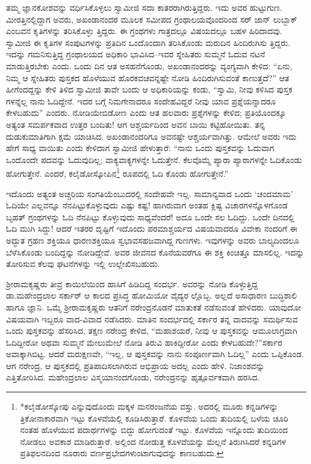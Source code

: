 ತಮ್ಮ ಜ್ಞಾನಕೋಶವನ್ನು ವರ್ಧಿಸಿಕೊಳ್ಳಲು ಸ್ವಾಮೀಜಿ ಸದಾ ಕಾತರರಾಗಿರುತ್ತಿದ್ದರು. ಇದು ಅವರ ಹುಟ್ಟುಗುಣ. ಮೀರತ್ತಿನಲ್ಲಿದ್ದಾಗ ಅವರು, ಅಖಂಡಾನಂದರ ಮೂಲಕ ಸಮೀಪದ ಗ್ರಂಥಾಲಯವೊಂದರಿಂದ ಸರ್ ಜಾನ್ ಲುಬ್ಬಾಕ್ ಎಂಬವನ ಕೃತಿಗಳನ್ನು ತರಿಸಿಕೊಳ್ಳು ತ್ತಿದ್ದರು. ಈ ಗ್ರಂಥಗಳು ಗಾತ್ರದಲ್ಲೂ ವಿಷಯದಲ್ಲೂ ಬಹಳ ಹಿರಿದಾದವು. ಸ್ವಾಮೀಜಿ ಈ ಕೃತಿಗಳ ಸಂಪುಟಗಳನ್ನು ಪ್ರತಿದಿನ ಒಂದೊಂದಾಗಿ ತರಿಸಿಕೊಂಡು ಮರುದಿನ ಹಿಂದಿರುಗಿಸು ತ್ತಿದ್ದರು. ಇದನ್ನು ಗಮನಿಸುತ್ತಿದ್ದ ಗ್ರಂಥಾಲಯದ ಅಧಿಕಾರಿ ಭಾವಿಸಿದ–ಇವರ ಸ್ನೇಹಿತರು ಸುಮ್ಮನೆ ಓದುವ ನಟನೆ ಮಾಡುತ್ತಿರಬೇಕು ಎಂದು. ಒಂದು ದಿನ ಆತ ಅಸಹನೆಗೊಂಡು, ಅಖಂಡಾನಂದರನ್ನು ವ್ಯಂಗ್ಯವಾಗಿ ಕೇಳಿದ: “ಏನು, ನಿಮ್ಮ ಆ ಸ್ನೇಹಿತರು ಪುಸ್ತಕದ ಹೊಳೆಯುವ ಹೊರಕವಚವನ್ನಷ್ಟೇ ನೋಡಿ ಹಿಂದಿರುಗಿಸುವಂತೆ ಕಾಣುತ್ತದೆ?” ಆತ ಹೀಗೆಂದದ್ದನ್ನು ಕೇಳಿ ತಿಳಿದ ಸ್ವಾಮೀಜಿ ತಾವೇ ಬಂದು ಆ ಅಧಿಕಾರಿಯನ್ನು ಕಂಡು, “ಸ್ವಾಮಿ, ನೀವು ಕಳಿಸಿದ ಪುಸ್ತಕ ಗಳನ್ನೆಲ್ಲ ನಾನು ಓದಿದ್ದೇನೆ. ಇದರ ಬಗ್ಗೆ ನಿಮಗೇನಾದರೂ ಸಂದೇಹವಿದ್ದರೆ ನೀವು ಯಾವ ಪ್ರಶ್ನೆಯನ್ನಾದರೂ ಕೇಳಬಹುದು” ಎಂದರು. ನೋಡಿಯೇಬಿಡೋಣ ಎಂದು ಆತ ಹಲವಾರು ಪ್ರಶ್ನೆಗಳನ್ನು ಕೇಳಿದ; ಪ್ರತಿಯೊಂದಕ್ಕೂ ಅತ್ಯಂತ ಸಮರ್ಪಕವಾದ ಉತ್ತರ ಬಂದಿತು! ಆಗ ಆಶ್ಚರ್ಯದಿಂದ ಅವನ ಬಾಯಿ ಕಟ್ಟಿಹೋಯಿತು. ತನ್ನ ದುಡುಕುಮಾತಿಗಾಗಿ ಕ್ಷಮೆ ಯಾಚಿಸಿದ. ಅಖಂಡಾನಂದರಿಗೂ ಅವನಷ್ಟೇ ಆಶ್ಚರ್ಯವಾಗಿತ್ತು. ಆಮೇಲೆ ಅವರು ಇದು ಹೇಗೆ ಸಾಧ್ಯ ವಾಯಿತು ಎಂದು ಕೇಳಿದಾಗ ಸ್ವಾಮೀಜಿ ಹೇಳುತ್ತಾರೆ: “ನಾನು ಒಂದು ಪುಸ್ತಕವನ್ನು ಓದುವಾಗ ಒಂದೊಂದೇ ಪದವನ್ನು ಓದುವುದಿಲ್ಲ; ವಾಕ್ಯವಾಕ್ಯಗಳನ್ನೇ ಓದುತ್ತೇನೆ. ಕೆಲವೊಮ್ಮೆ ಪ್ಯಾರಾ ಪ್ಯಾರಾಗಳನ್ನೇ ಓದಿಕೊಂಡು ಹೋಗುತ್ತೇನೆ. ಎಂದರೆ, ಕಲೈಡೋಸ್ಕೋಪಿನ\footnote{*ಕಲೈಡೋಸ್ಕೋಪು ಎನ್ನುವುದೊಂದು ಮಕ್ಕಳ ಮನರಂಜನೆಯ ವಸ್ತು. ಅದರಲ್ಲಿ ಮೂರು ಕನ್ನಡಿಗಳನ್ನು ತ್ರಿಕೋನಾಕಾರವಾಗಿ ಇಟ್ಟು ಕೊಳವೆಯಲ್ಲಿ ಕೂಡಿಸಿರುತ್ತಾರೆ. ಕೊಳವೆಯ ಒಂದು ತುದಿಯಲ್ಲಿ ಬಳೆಯ ಚೂರಿ ನಂತಹ ಹೊಳೆಯುವ ಪದಾರ್ಥಗಳನ್ನು ಬಿದ್ದು ಹೋಗುದಂತೆ ಇಟ್ಟು. ಕೊಳವೆಯ ಇನ್ನೊಂದು ತುದಿಯಿಂದ ನೋಡಲು ಅವಕಾಶ ಮಾಡಿರುತ್ತಾರೆ. ಅಲ್ಲಿಂದ ನೋಡುತ್ತ ಕೊಳವೆಯನ್ನು ಮೆಲ್ಲನೆ ತಿರುಗಿಸಿದರೆ ಕನ್ನಡಿಗಳ ಪ್ರತಿಫಲನದಿಂದ ನೂರಾರು ವರ್ಣಪ್ರಭೇದಗಳುಂಟಾಗುವುದನ್ನು ಕಾಣಬಹುದು.} ರೂಪದಲ್ಲಿ ಓದಿ ಕೊಂಡು ಹೋಗುತ್ತೇನೆ.”

ಇದೊಂದು ಅತ್ಯಂತ ಅಚ್ಚರಿಯ ಸಂಗತಿಯೆಂಬುದರಲ್ಲಿ ಸಂದೇಹವೇ ಇಲ್ಲ. ಸಾಮಾನ್ಯವಾದ ಒಂದು ‘ಚಂದಮಾಮ’ ಓದಿಯೇ ಎಲ್ಲವನ್ನೂ ನೆನಪಿಟ್ಟುಕೊಳ್ಳುವುದು ಎಷ್ಟು ಕಷ್ಟ! ಹಾಗಿರುವಾಗ ಅಂತಹ ಕ್ಲಿಷ್ಟ ವಿಚಾರಗಳನ್ನೊಳಗೊಂಡ ಬೃಹತ್ ಗ್ರಂಥಗಳನ್ನು ಓದಿ ನೆನಪಿಟ್ಟು ಕೊಳ್ಳುವುದು ಸಾಧ್ಯವೆಂದರೆ! ಅದೂ ಒಂದೇ ಸಲ ಓದಿದ್ದು. ಒಂದೇ ದಿನದಲ್ಲಿ ಓದಿ ಮುಗಿ ಸಿದ್ದು! ಆದರೆ ಇತರರ ದೃಷ್ಟಿಗೆ ಇದೊಂದು ಪರಮಾಶ್ಚರ್ಯದ ವಿಷಯವಾದರೂ ವಿವೇಕಾ ನಂದರಿಗೆ ಈ ಅದ್ಭುತ ಗ್ರಹಣ ಶಕ್ತಿಯೂ ಧಾರಣಶಕ್ತಿಯೂ ಸ್ವಭಾವಸಹಜವಾಗಿದ್ದ ಗುಣಗಳು. ಇವುಗಳನ್ನು ಅವರು ಬಾಲ್ಯದಿಂದಲೂ ಬೆಳೆಸಿಕೊಂಡು ಬಂದಿದ್ದನ್ನು ನೋಡಿದ್ದೇವೆ. ಅವರ ಜೀವನದ ಕೊನೆಯವರೆಗೂ ಈ ಶಕ್ತಿ ಕಿಂಚಿತ್ತೂ ಮಾಸಲಿಲ್ಲ. ಇದನ್ನು ತೋರಿಸುವ ಕೆಲವು ಘಟನೆಗಳನ್ನು ಇಲ್ಲಿ ಉಲ್ಲೇಖಿಸಬಹುದು.

ಶ್ರೀರಾಮಕೃಷ್ಣರು ತೀವ್ರ ಕಾಯಿಲೆಯಿಂದ ಹಾಸಿಗೆ ಹಿಡಿದಿದ್ದ ಸಂದರ್ಭ. ಅವರನ್ನು ನೋಡಿ ಕೊಳ್ಳುತ್ತಿದ್ದ ಡಾ.ಮಹೇಂದ್ರಲಾಲ ಸರ್ಕಾರ್ ಆ ಕಾಲದ ಪ್ರಸಿದ್ಧ ಹೋಮಿಯೋ ವೈದ್ಯರ ಲ್ಲೊಬ್ಬ. ಅಲ್ಲದೆ ಅಸಾಧಾರಣ ಬುದ್ಧಿಶಾಲಿ ಹಾಗೂ ಜ್ಞಾನಿ. ಒಮ್ಮೆ ಶ್ರೀರಾಮಕೃಷ್ಣರು ಆತನಿಗೆ ನರೇಂದ್ರನೊಡನೆ ಮಾತುಕತೆ ನಡೆಸುವಂತೆ ಹೇಳಿದರು. ಯಾವುದೋ ವಿಷಯವಾಗಿ ಇಬ್ಬರೂ ವಾದ-ವಿವಾದ ನಡೆಸಿದರು. ಮಾತಿನ ಸಂದರ್ಭದಲ್ಲಿ ಸರ್ಕಾರ ತನ್ನ ವಾದವನ್ನು ಸಮರ್ಥಿಸುವ ಒಂದು ಪುಸ್ತಕವನ್ನು ಹೆಸರಿಸಿದ. ತಕ್ಷಣ ನರೇಂದ್ರ ಕೇಳಿದ, “ಮಹಾಶಯರೆ, ನೀವು ಆ ಪುಸ್ತಕವನ್ನು ಆಮೂಲಾಗ್ರವಾಗಿ ಓದಿದ್ದೀರೋ ಅಥವಾ ಸುಮ್ಮನೆ ಮೇಲುಮೇಲೆ ನೋಡಿ ತಿರುವಿ ಹಾಕಿದ್ದೀರೋ ಎಂದು ಕೇಳಬಹುದೇ?”ಸರ್ಕಾರ ಅವಾಕ್ಕಾಗಿಬಿಟ್ಟ. ಆದರೆ ಮರುಕ್ಷಣವೇ, “ಇಲ್ಲ, ಆ ಪುಸ್ತಕವನ್ನು ನಾನು ಸಂಪೂರ್ಣವಾಗಿ ಓದಿಲ್ಲ” ಎಂದು ಒಪ್ಪಿಕೊಂಡ. ಆಗ ನರೇಂದ್ರ, ಆ ಪುಸ್ತಕದಲ್ಲಿ ಪ್ರತಿಪಾದಿಸಲಾಗಿರುವ ಅಭಿಪ್ರಾಯ ಅದಲ್ಲ ಎಂದು ಹೇಳಿ. ನಿಜಾಂಶವನ್ನು ಎತ್ತಿತೋರಿಸಿದ. ಮಹೇಂದ್ರಲಾಲ ವಿಸ್ಮಯಾನಂದಗೊಂಡು, ನರೇಂದ್ರನನ್ನು ಹೃತ್ಪೂರ್ವಕವಾಗಿ ಹರಸಿದ.

